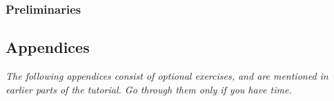 \maketitle

{\setcounter{tocdepth}{1} \tableofcontents}

\section{Preliminaries}

\ifsshpreparation

\fi






%




%

\begin{appendices}
{}\part*{Appendices}
\emph{The following appendices consist of optional exercises, and are mentioned in earlier parts of the tutorial. Go through them only if you have time.}


\end{appendices}

